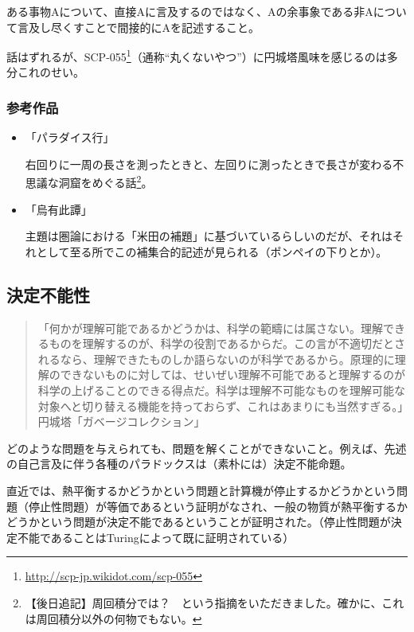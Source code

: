 \documentclass[10pt, a5paper, twoside]{jsarticle}
\begin{document}
			ある事物Aについて、直接Aに言及するのではなく、Aの余事象である非Aについて言及し尽くすことで間接的にAを記述すること。

			話はずれるが、SCP-055\footnote{\url{http://scp-jp.wikidot.com/scp-055}}（通称“丸くないやつ”）に円城塔風味を感じるのは多分これのせい。

			\subsubsection*{参考作品}

				\begin{itemize}

					\item 「パラダイス行」

						右回りに一周の長さを測ったときと、左回りに測ったときで長さが変わる不思議な洞窟をめぐる話\footnote{【後日追記】周回積分では？　という指摘をいただきました。確かに、これは周回積分以外の何物でもない。}。

					\item 「烏有此譚」

						主題は圏論における「米田の補題」に基づいているらしいのだが、それはそれとして至る所でこの補集合的記述が見られる（ポンペイの下りとか）。

				\end{itemize}

		\subsection{決定不能性}

			\begin{quote}

				「何かが理解可能であるかどうかは、科学の範疇には属さない。理解できるものを理解するのが、科学の役割であるからだ。この言が不適切だとされるなら、理解できたものしか語らないのが科学であるから。原理的に理解のできないものに対しては、せいぜい理解不可能であると理解するのが科学の上げることのできる得点だ。科学は理解不可能なものを理解可能な対象へと切り替える機能を持っておらず、これはあまりにも当然すぎる。」\hspace{\fill}円城塔「ガベージコレクション」

			\end{quote}

			どのような問題を与えられても、問題を解くことができないこと。例えば、先述の自己言及に伴う各種のパラドックスは（素朴には）決定不能命題。

			直近では、熱平衡するかどうかという問題と計算機が停止するかどうかという問題（停止性問題）が等価であるという証明がなされ、一般の物質が熱平衡するかどうかという問題が決定不能であるということが証明された。（停止性問題が決定不能であることはTuringによって既に証明されている）
\end{document}
